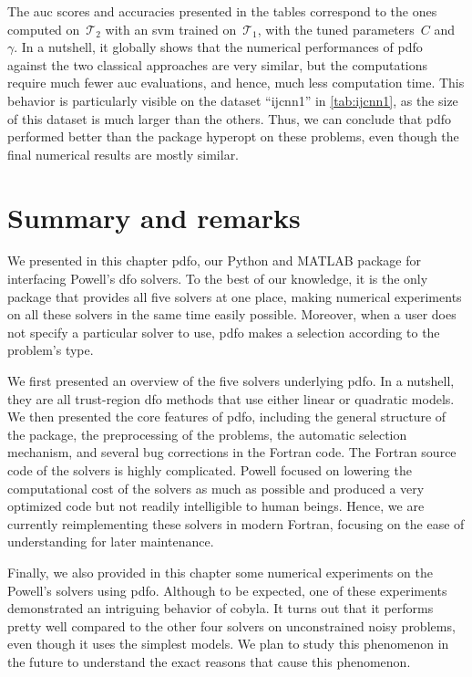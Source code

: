 The \gls{auc} scores and accuracies presented in the tables correspond to the ones computed on~$\mathcal{T}_2$ with an \gls{svm} trained on~$\mathcal{T}_1$, with the tuned parameters~$C$ and~$\gamma$.
In a nutshell, it globally shows that the numerical performances of \gls{pdfo} against the two classical approaches are very similar, but the computations require much fewer \gls{auc} evaluations, and hence, much less computation time.
This behavior is particularly visible on the dataset \enquote{ijcnn1} in \cref{tab:ijcnn1}, as the size of this dataset is much larger than the others.
Thus, we can conclude that \gls{pdfo} performed better than the package hyperopt on these problems, even though the final numerical results are mostly similar.

\section{Summary and remarks}


We presented in this chapter \gls{pdfo}, our Python and MATLAB package for interfacing Powell's \gls{dfo} solvers.
To the best of our knowledge, it is the only package that provides all five solvers at one place, making numerical experiments on all these solvers in the same time easily possible.
Moreover, when a user does not specify a particular solver to use, \gls{pdfo} makes a selection according to the problem's type.

We first presented an overview of the five solvers underlying \gls{pdfo}.
In a nutshell, they are all trust-region \gls{dfo} methods that use either linear or quadratic models.
We then presented the core features of \gls{pdfo}, including the general structure of the package, the preprocessing of the problems, the automatic selection mechanism, and several bug corrections in the Fortran code.
The Fortran source code of the solvers is highly complicated.
Powell focused on lowering the computational cost of the solvers as much as possible and produced a very optimized code but not readily intelligible to human beings.
Hence, we are currently reimplementing these solvers in modern Fortran, focusing on the ease of understanding for later maintenance.

Finally, we also provided in this chapter some numerical experiments on the Powell's solvers using \gls{pdfo}.
Although to be expected, one of these experiments demonstrated an intriguing behavior of \gls{cobyla}.
It turns out that it performs pretty well compared to the other four solvers on unconstrained noisy problems, even though it uses the simplest models.
We plan to study this phenomenon in the future to understand the exact reasons that cause this phenomenon.
